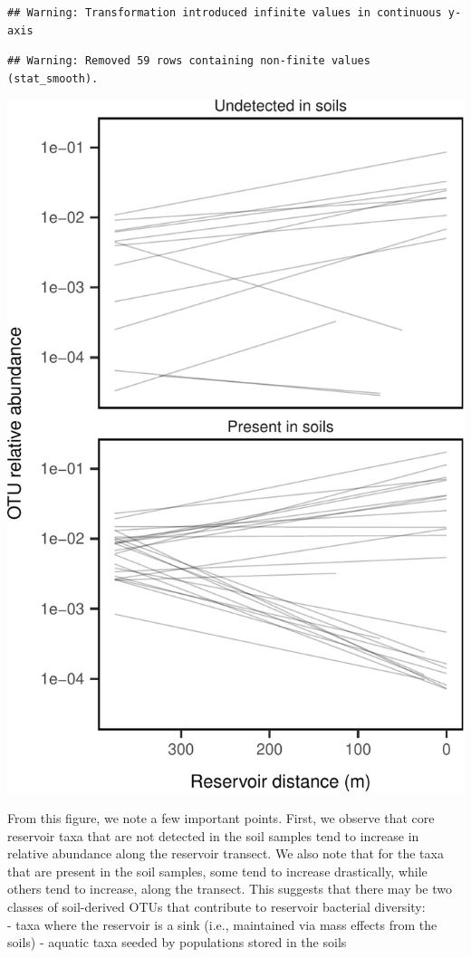 \documentclass[]{article}
\begin{document}
\begin{verbatim}
## Warning: Transformation introduced infinite values in continuous y-axis
\end{verbatim}

\begin{verbatim}
## Warning: Removed 59 rows containing non-finite values (stat_smooth).
\end{verbatim}

\begin{center}\includegraphics{ReservoirGradient_files/figure-latex/coreplot-1} \end{center}

From this figure, we note a few important points. First, we observe that
core reservoir taxa that are not detected in the soil samples tend to
increase in relative abundance along the reservoir transect. We also
note that for the taxa that are present in the soil samples, some tend
to increase drastically, while others tend to increase, along the
transect. This suggests that there may be two classes of soil-derived
OTUs that contribute to reservoir bacterial diversity:\\
- taxa where the reservoir is a sink (i.e., maintained via mass effects
from the soils) - aquatic taxa seeded by populations stored in the soils
\end{document}
